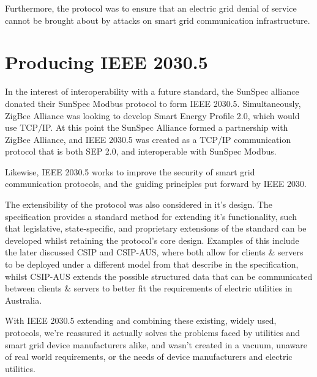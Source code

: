 Furthermore, the protocol was to ensure that an electric grid denial of service cannot be brought about by attacks on smart grid communication infrastructure. \cite{2030Security}
\cite[]{2030} 

\section{Producing IEEE 2030.5}

In the interest of interoperability with a future standard, the SunSpec alliance donated their SunSpec Modbus protocol to form IEEE 2030.5. Simultaneously, ZigBee Alliance was looking to develop Smart Energy Profile 2.0, which would use TCP/IP.
At this point the SunSpec Alliance formed a partnership with ZigBee Alliance, and IEEE 2030.5 was created as a TCP/IP communication protocol that is both SEP 2.0, and interoperable with SunSpec Modbus. \cite[]{SunspecModbusArticle}

Likewise, IEEE 2030.5 works to improve the security of smart grid communication protocols, and the guiding principles put forward by IEEE 2030. 

The extensibility of the protocol was also considered in it's design. The specification provides a standard method for extending it's functionality, such that legislative, state-specific, and proprietary extensions of the standard can be developed whilst retaining the protocol's core design. Examples of this include the later discussed CSIP and CSIP-AUS, where both allow for clients \& servers to be deployed under a different model from that describe  in the specification, whilst CSIP-AUS extends the possible structured data that can be communicated between clients \& servers to better fit the requirements of electric utilities in Australia.

With IEEE 2030.5 extending and combining these existing, widely used, protocols, we're reassured it actually solves the problems faced by utilities and smart grid device manufacturers alike, and wasn't created in a vacuum, unaware of real world requirements, or the needs of device manufacturers and electric utilities.


